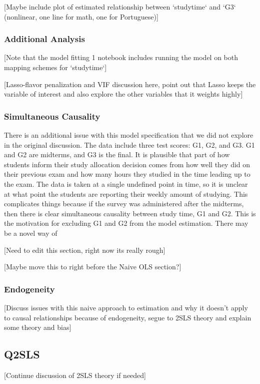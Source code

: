 \documentclass[12pt]{article}
\begin{document}
\textcolor{BrickRed}{[Maybe include plot of estimated relationship between `studytime` and `G3` (nonlinear, one line for math, one for Portuguese)]}

\subsubsection{Additional Analysis}
\textcolor{BrickRed}{[Note that the model fitting 1 notebook includes running the model on both mapping schemes for `studytime`]}

\textcolor{BrickRed}{[Lasso-flavor penalization and VIF discussion here, point out that Lasso keeps the variable of interest and also explore the other variables that it weights highly]}

\subsubsection{Simultaneous Causality}
There is an additional issue with this model specification that we did not explore in the original discussion. The data include three test scores: G1, G2, and G3. G1 and G2 are midterms, and G3 is the final. It is plausible that part of how students inform their study allocation decision comes from how well they did on their previous exam and how many hours they studied in the time leading up to the exam. The data is taken at a single undefined point in time, so it is unclear at what point the students are reporting their weekly amount of studying. This complicates things because if the survey was administered after the midterms, then there is clear simultaneous causality between study time, G1 and G2. This is the motivation for excluding G1 and G2 from the model estimation. There may be a novel way of 

\textcolor{BrickRed}{[Need to edit this section, right now its really rough]}

\textcolor{BrickRed}{[Maybe move this to right before the Naive OLS section?]}

\subsubsection{Endogeneity}
\textcolor{BrickRed}{[Discuss issues with this naive approach to estimation and why it doesn't apply to causal relationships because of endogeneity, segue to 2SLS theory and explain some theory and bias]}

\subsection{Q2SLS}
\textcolor{BrickRed}{[Continue discussion of 2SLS theory if needed]}
\end{document}
